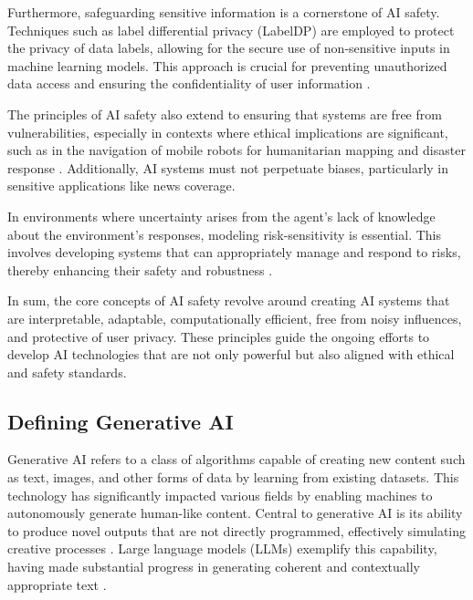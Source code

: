 Furthermore, safeguarding sensitive information is a cornerstone of AI safety. Techniques such as label differential privacy (LabelDP) are employed to protect the privacy of data labels, allowing for the secure use of non-sensitive inputs in machine learning models. This approach is crucial for preventing unauthorized data access and ensuring the confidentiality of user information \cite{wang2024espewrobustcopyrightprotection}.



The principles of AI safety also extend to ensuring that systems are free from vulnerabilities, especially in contexts where ethical implications are significant, such as in the navigation of mobile robots for humanitarian mapping and disaster response \cite{brandao2020fairnavigationplanninghumanitarian}. Additionally, AI systems must not perpetuate biases, particularly in sensitive applications like news coverage.



In environments where uncertainty arises from the agent's lack of knowledge about the environment's responses, modeling risk-sensitivity is essential. This involves developing systems that can appropriately manage and respond to risks, thereby enhancing their safety and robustness \cite{wang2023environmenttransformerpolicyoptimization}.



In sum, the core concepts of AI safety revolve around creating AI systems that are interpretable, adaptable, computationally efficient, free from noisy influences, and protective of user privacy. These principles guide the ongoing efforts to develop AI technologies that are not only powerful but also aligned with ethical and safety standards.



\subsection{Defining Generative AI} \label{subsec:Defining Generative AI}

Generative AI refers to a class of algorithms capable of creating new content such as text, images, and other forms of data by learning from existing datasets. This technology has significantly impacted various fields by enabling machines to autonomously generate human-like content. Central to generative AI is its ability to produce novel outputs that are not directly programmed, effectively simulating creative processes \cite{touvron2023llama}. Large language models (LLMs) exemplify this capability, having made substantial progress in generating coherent and contextually appropriate text \cite{tang2023mvpmultitasksupervisedpretraining}.



